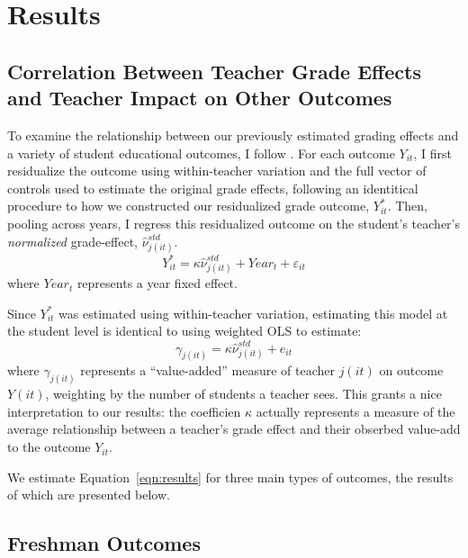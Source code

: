\documentclass[../thesis_main.tex]{subfiles}
\begin{document}
\doublespacing
\section{Results}
\label{section:results}

\subsection{Correlation Between Teacher Grade Effects and Teacher Impact on Other Outcomes}

To examine the relationship between our previously estimated grading effects and a variety of student educational outcomes, I follow \citet{chettyMeasuringImpactsTeachers2014a}. For each outcome $Y_{it}$, I first residualize the outcome using within-teacher variation and the full vector of controls used to estimate the original grade effects, following an identitical procedure to how we constructed our residualized grade outcome, $Y_{it}^*$. Then, pooling across years, I regress this residualized outcome on the student's teacher's \textit{normalized} grade-effect, $\hat{\nu}_{j(it)}^{std}$.
\begin{equation}
	Y_{it}^* = \kappa \hat{\nu}_{j(it)}^{std} + Year_{t} + \varepsilon_{it}
\end{equation}
where $Year_{t}$ represents a year fixed effect. 

Since $Y_{it}^*$ was estimated using within-teacher variation, estimating this model at the student level is identical to using weighted OLS to estimate:
\begin{equation}
	\gamma_{j(it)} = \kappa \hat{\nu}_{j(it)}^{std} + e_{it}
	\label{eqn:results}
\end{equation}
where $\gamma_{j(it)}$ represents a ``value-added'' measure of teacher $j(it)$ on outcome $Y(it)$, weighting by the number of students a teacher sees. This grants a nice interpretation to our results: the coefficien $\kappa$ actually represents a measure of the average relationship between a teacher's grade effect and their obserbed value-add to the outcome $Y_{it}$. 

We estimate Equation~\ref{eqn:results} for three main types of outcomes, the results of which are presented below.

\subsection*{Freshman Outcomes}
\end{document}
